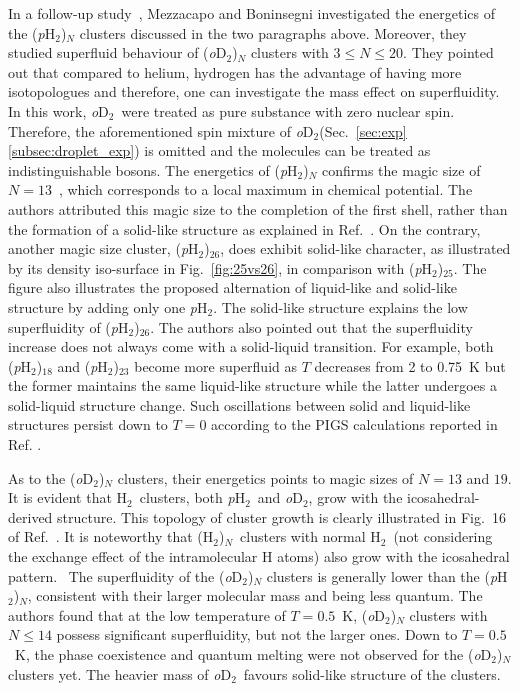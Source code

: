 \documentclass[12pt]{iopart}
\newcommand{\odtwo}{{\em o}D$_2$}
\newcommand{\hydrogen}{H$_2$}
\newcommand{\phtwo}{{\em p}H$_2$}
\begin{document}
In a follow-up study~\cite{quantum_melting}, Mezzacapo and Boninsegni investigated the energetics of the (\phtwo)$_N$ clusters discussed in the two paragraphs above. Moreover, they studied superfluid behaviour of (\odtwo)$_N$ clusters with $3\le N\le 20$. They pointed out that compared to helium, hydrogen has the advantage of having more isotopologues and therefore, one can investigate the mass effect on superfluidity. In this work, \odtwo~were treated as pure substance with zero nuclear spin. Therefore, the aforementioned spin mixture of \odtwo (Sec.~\ref{sec:exp}\ref{subsec:droplet_exp}) is omitted and the molecules can be treated as indistinguishable bosons. 
The energetics of (\phtwo)$_N$ confirms the magic size of $N=13$~\cite{guardiola_h2_cluster,cuervo2006}, which corresponds to a local maximum in chemical potential. 
The authors attributed this magic size to the completion of the first shell, rather than the formation of a solid-like structure as explained in Ref.~\cite{guardiola_h2_cluster}. On the contrary, another magic size cluster, (\phtwo)$_{26}$, does exhibit solid-like character, as illustrated by its density iso-surface in Fig.~\ref{fig:25vs26}, in comparison with (\phtwo)$_{25}$. The figure also illustrates the proposed alternation of liquid-like and solid-like structure by adding only one \phtwo. The solid-like structure explains the low superfluidity of (\phtwo)$_{26}$. 
The authors also pointed out that the superfluidity increase does not always come with a solid-liquid transition. 
For example, both (\phtwo)$_{18}$ and (\phtwo)$_{23}$ become more superfluid as $T$ decreases from 2 to 0.75~K but the former maintains the same liquid-like structure while the latter undergoes a solid-liquid structure change. Such oscillations between solid and liquid-like structures persist down to $T=0$ according to the PIGS calculations reported in Ref. \cite{cuervo2008}.

As to the (\odtwo)$_N$ clusters, their energetics points to magic sizes of $N=13$ and $19$. It is evident that \hydrogen~clusters, both \phtwo~and \odtwo, grow with the icosahedral-derived structure. 
This topology of cluster growth is clearly illustrated in Fig.~16 of Ref.~\cite{quantum_melting}.
It is noteworthy that (\hydrogen)$_N$~clusters with normal \hydrogen~(not considering the exchange effect of the intramolecular H atoms) also grow with the icosahedral pattern.~\cite{martinez_h2_clusters}
The superfluidity of the (\odtwo)$_N$ clusters is generally lower than the (\phtwo)$_N$, 
consistent with their larger molecular mass and being less quantum. 
The authors found that at the low temperature of $T=0.5$~K, (\odtwo)$_N$ clusters with $N\le 14$ possess significant superfluidity, but not the larger ones. 
Down to $T=0.5$~K, the phase coexistence and quantum melting were not observed for the (\odtwo)$_N$ clusters yet. The heavier mass of \odtwo~favours solid-like structure of the clusters.
\end{document}
